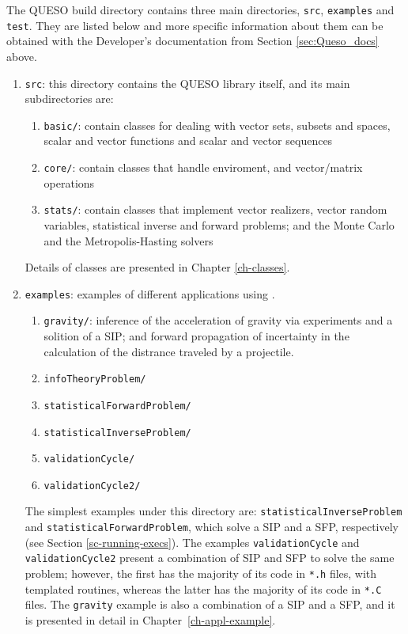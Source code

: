The QUESO build directory contains three main directories, \texttt{src}, \texttt{examples} and \texttt{test}. They are listed below and more specific
information about them can be obtained with the Developer's documentation from Section \ref{sec:Queso_docs} above.
\begin{enumerate}
\item \texttt{src}: this directory contains the QUESO library itself, and its main subdirectories are:
  \begin{enumerate}
  \item \texttt{basic/}: contain classes for dealing with vector sets, subsets and spaces, scalar and vector functions and scalar and vector sequences
  \item \texttt{core/}: contain classes that handle \Queso{} enviroment, and vector/matrix operations
  \item \texttt{stats/}: contain classes that implement vector realizers, vector random variables, statistical inverse and forward problems; and the Monte Carlo and the Metropolis-Hasting solvers
  \end{enumerate}
  
Details of \Queso{}  classes are presented in Chapter \ref{ch-classes}.

\item \texttt{examples}:  examples of different applications using \Queso{}. 
\begin{enumerate}
\item \texttt{gravity/}: inference of the acceleration of gravity via experiments and a solition of a SIP; and forward propagation of incertainty in the calculation of the distrance traveled by a projectile.
\item \texttt{infoTheoryProblem/}
\item \texttt{statisticalForwardProblem/}
\item \texttt{statisticalInverseProblem/}
\item \texttt{validationCycle/} 
\item \texttt{validationCycle2/}
\end{enumerate}
The simplest examples under this directory are: \verb+statisticalInverseProblem+ and \verb+statisticalForwardProblem+, which solve a SIP and a SFP, respectively (see Section \ref{sc-running-execs}). The examples \verb+validationCycle+ and \verb+validationCycle2+ present a combination of SIP and SFP to solve the same problem; however, the first has the majority of its code in \verb+*.h+ files, with templated routines, whereas the latter has the majority of its code in \verb+*.C+ files. The \verb+gravity+ example is also a combination of a SIP and a SFP, and it is presented in detail in Chapter~\ref{ch-appl-example}.




\end{enumerate}
